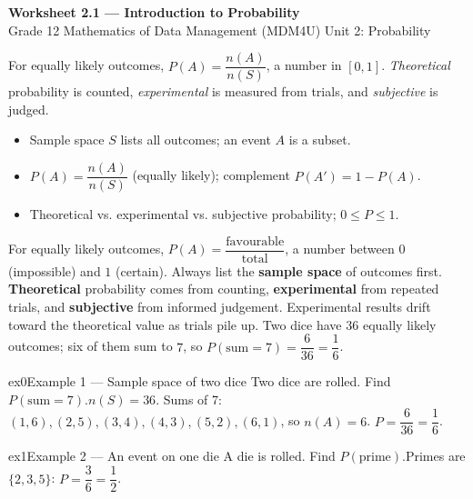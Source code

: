 \documentclass[11pt]{article}
\begin{document}
\begin{center}
{\LARGE\bfseries\color{titleblue}Worksheet 2.1 --- Introduction to Probability}\\[2pt]
{\small Grade 12 Mathematics of Data Management (MDM4U) \textperiodcentered{} Unit 2: Probability}
\end{center}

\begin{ideabox}
For equally likely outcomes, $P(A)=\dfrac{n(A)}{n(S)}$, a number in $[0,1]$. \emph{Theoretical} probability is counted, \emph{experimental} is measured from trials, and \emph{subjective} is judged.
\begin{itemize}[leftmargin=*,itemsep=2pt]
  \item Sample space $S$ lists all outcomes; an event $A$ is a subset.
  \item $P(A)=\dfrac{n(A)}{n(S)}$ (equally likely); complement $P(A')=1-P(A)$.
  \item Theoretical vs. experimental vs. subjective probability; $0\le P\le1$.
\end{itemize}
\end{ideabox}

\begin{learnbox}
For equally likely outcomes, $P(A)=\dfrac{\text{favourable}}{\text{total}}$, a number between $0$ (impossible) and $1$ (certain). Always list the \textbf{sample space} of outcomes first.
\textbf{Theoretical} probability comes from counting, \textbf{experimental} from repeated trials, and \textbf{subjective} from informed judgement. Experimental results drift toward the theoretical value as trials pile up.
Two dice have $36$ equally likely outcomes; six of them sum to $7$, so $P(\text{sum}=7)=\dfrac{6}{36}=\dfrac16$.
\end{learnbox}


\begin{example}{ex0}{Example 1 --- Sample space of two dice}
Two dice are rolled. Find $P(\text{sum}=7)$.\soln $n(S)=36$. Sums of 7: $(1,6),(2,5),(3,4),(4,3),(5,2),(6,1)$, so $n(A)=6$. $P=\dfrac{6}{36}=\dfrac16$.
\end{example}

\begin{example}{ex1}{Example 2 --- An event on one die}
A die is rolled. Find $P(\text{prime})$.\soln Primes are $\{2,3,5\}$: $P=\dfrac36=\dfrac12$.
\end{example}
\end{document}
